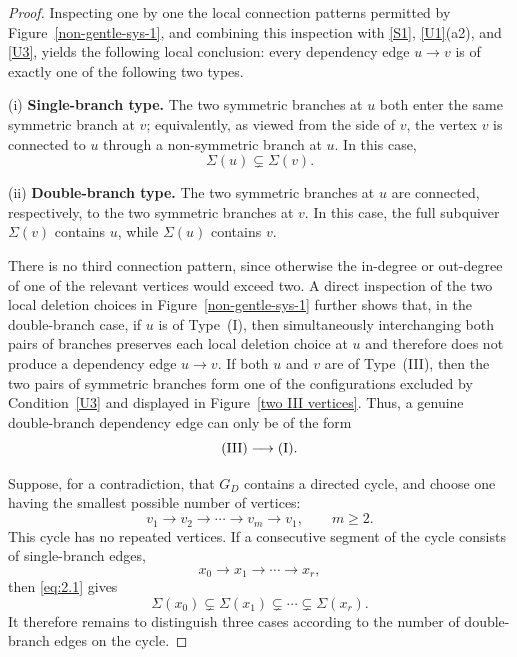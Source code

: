 \documentclass[11pt]{amsart}
\numberwithin{equation}{section}
\theoremstyle{definition}
\begin{document}
\begin{proof}
Inspecting one by one the local connection patterns permitted by
Figure~\ref{non-gentle-sys-1}, and combining this inspection with \ref{S1}, \ref{U1}\textup{(a2)}, and \ref{U3}, yields the following local conclusion: every
dependency edge $u\to v$ is of exactly one of the following two types.

\textup{(i)} \textbf{Single-branch type.}
        The two symmetric branches at $u$ both enter the same
        symmetric branch at $v$; equivalently, as viewed from the
        side of $v$, the vertex $v$ is connected to $u$ through a
        non-symmetric branch at $u$. In this case,
        \begin{equation}\label{eq:2.1}
        \Sigma(u)\subsetneq\Sigma(v).
        \end{equation}

\textup{(ii)} \textbf{Double-branch type.}
        The two symmetric branches at $u$ are connected,
        respectively, to the two symmetric branches at $v$. In
        this case, the full subquiver $\Sigma(v)$ contains $u$,
        while $\Sigma(u)$ contains $v$.

There is no third connection pattern, since otherwise the
in-degree or out-degree of one of the relevant vertices would
exceed two. A direct inspection of the two local deletion choices
in Figure~\ref{non-gentle-sys-1} further shows that, in the
double-branch case, if $u$ is of Type~\textup{(I)}, then
simultaneously interchanging both pairs of branches preserves each
local deletion choice at $u$ and therefore does not produce a
dependency edge $u\to v$. If both $u$ and $v$ are of
Type~\textup{(III)}, then the two pairs of symmetric branches form
one of the configurations excluded by Condition~\ref{U3} and
displayed in Figure~\ref{two III vertices}. Thus, a genuine
double-branch dependency edge can only be of the form
\begin{equation}\label{eq:2.2}
\textup{(III)}\longrightarrow\textup{(I)}.
\end{equation}

Suppose, for a contradiction, that $G_D$ contains a directed
cycle, and choose one having the smallest possible number of
vertices:
\begin{equation}\label{eq:2.3}
v_1\longrightarrow v_2\longrightarrow\cdots
\longrightarrow v_m\longrightarrow v_1,
\qquad m\geq2.
\end{equation}
This cycle has no repeated vertices. If a consecutive segment of
the cycle consists of single-branch edges,
\[
x_0\longrightarrow x_1\longrightarrow\cdots
\longrightarrow x_r,
\]
then \eqref{eq:2.1} gives
\[
\Sigma(x_0)\subsetneq\Sigma(x_1)\subsetneq\cdots
\subsetneq\Sigma(x_r).
\]
It therefore remains to distinguish three cases according to the
number of double-branch edges on the cycle.


\end{proof}
\end{document}
